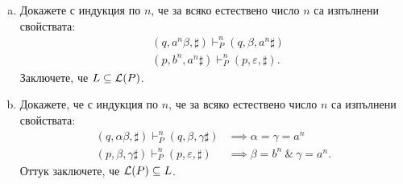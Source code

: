 \begin{extra}
\begin{example}
  \begin{enumerate}[a)]
  \item
    Докажете с индукция по $n$, че за всяко естествено число $n$ са изпълнени свойствата:
    \begin{align}
      & (q, a^n\beta, \sharp) \vdash^n_P (q, \beta, a^n\sharp) \label{eq:anbn:1}\\
      & (p, b^n, a^n\sharp) \vdash^n_P (p, \varepsilon,\sharp). \label{eq:anbn:2}
    \end{align}
    Заключете, че $L \subseteq \mathcal{L}(P)$.
  \item
    Докажете, че с индукция по $n$, че за всяко естествено число $n$ са изпълнени свойствата:
    \begin{align}
      (q, \alpha\beta, \sharp) \vdash^n_P (q, \beta, \gamma\sharp)  & \implies \alpha = \gamma = a^n \label{eq:anbn:3}\\
      (p, \beta, \gamma\sharp) \vdash^n_P (p, \varepsilon, \sharp) & \implies \beta = b^n\ \&\ \gamma = a^n. \label{eq:anbn:4}
    \end{align}
    Оттук заключете, че $\mathcal{L}(P) \subseteq L$.    
  \end{enumerate}
\end{example}


\end{extra}
